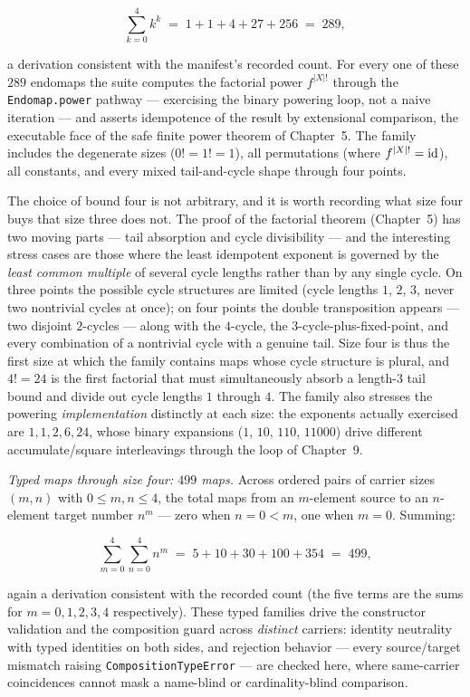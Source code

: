 \[
\sum_{k=0}^{4} k^k \;=\; 1 + 1 + 4 + 27 + 256 \;=\; 289 ,
\]

a derivation consistent with the manifest's recorded count. For every one
of these $289$ endomaps the suite computes the factorial power
$f^{|X|!}$ through the \texttt{Endomap.power} pathway --- exercising the
binary powering loop, not a naive iteration --- and asserts idempotence of
the result by extensional comparison, the executable face of the safe
finite power theorem of Chapter~5. The family includes the degenerate
sizes ($0! = 1! = 1$), all permutations (where $f^{|X|!} = \mathrm{id}$), all
constants, and every mixed tail-and-cycle shape through four points.

The choice of bound four is not arbitrary, and it is worth recording what
size four buys that size three does not. The proof of the factorial
theorem (Chapter~5) has two moving parts --- tail absorption and cycle
divisibility --- and the interesting stress cases are those where the
least idempotent exponent is governed by the \emph{least common multiple}
of several cycle lengths rather than by any single cycle. On three points
the possible cycle structures are limited (cycle lengths $1$, $2$, $3$,
never two nontrivial cycles at once); on four points the double
transposition appears --- two disjoint $2$-cycles --- along with the
$4$-cycle, the $3$-cycle-plus-fixed-point, and every combination of a
nontrivial cycle with a genuine tail. Size four is thus the first size at
which the family contains maps whose cycle structure is plural, and
$4! = 24$ is the first factorial that must simultaneously absorb a
length-$3$ tail bound and divide out cycle lengths $1$ through $4$. The
family also stresses the powering \emph{implementation} distinctly at
each size: the exponents actually exercised are $1, 1, 2, 6, 24$, whose
binary expansions ($1$, $10$, $110$, $11000$) drive different
accumulate/square interleavings through the loop of Chapter~9.

\emph{Typed maps through size four: $499$ maps.} Across ordered pairs of
carrier sizes $(m, n)$ with $0 \le m, n \le 4$, the total maps from an
$m$-element source to an $n$-element target number $n^m$ --- zero when
$n = 0 < m$, one when $m = 0$. Summing:

\[
\sum_{m=0}^{4}\sum_{n=0}^{4} n^{m}
\;=\; 5 + 10 + 30 + 100 + 354 \;=\; 499 ,
\]

again a derivation consistent with the recorded count (the five terms are
the sums for $m = 0, 1, 2, 3, 4$ respectively). These typed families
drive the constructor validation and the composition guard across
\emph{distinct} carriers: identity neutrality with typed identities on
both sides, and rejection behavior --- every source/target mismatch
raising \texttt{CompositionTypeError} --- are checked here, where
same-carrier coincidences cannot mask a name-blind or cardinality-blind
comparison.

